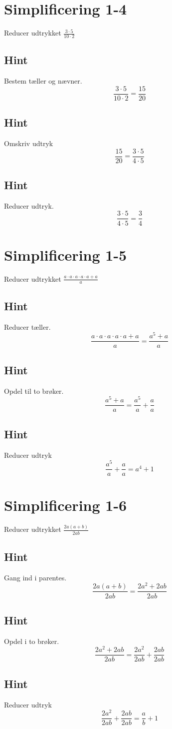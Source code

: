 \documentclass{article}
\newenvironment{exercise}[1]{\newpage\section{#1}}{}
\newcommand{\answerbox}[1]{\fbox{$#1$}}
\newcommand{\hint}{\subsection*{Hint}}
\begin{document}
\newpage

\begin{exercise}{Simplificering 1-4}
	
	Reducer udtrykket $\frac{3 \cdot 5}{10 \cdot 2}$
	
	\answerbox{\frac{3}{4}}
	
	\hint
	
	Bestem tæller og nævner.
	\[
	\frac{3 \cdot 5}{10 \cdot 2} = \frac{15}{20}
	\]
	
	\hint
	
	Omskriv udtryk
	\[
	 \frac{15}{20} = \frac{3 \cdot 5}{4 \cdot 5}
	\]
	
	\hint 
	
	Reducer udtryk.
	\[
	\frac{3 \cdot 5}{4 \cdot 5} = \frac{3}{4}
	\]
	
\end{exercise}

\newpage

\begin{exercise}{Simplificering 1-5}
	
	Reducer udtrykket $\frac{a \cdot a \cdot a \cdot a \cdot a + a}{a}$
	
	\answerbox{a^4 + 1}
	
	\hint
	
	Reducer tæller.
	\[
	\frac{a \cdot a \cdot a \cdot a \cdot a + a}{a}  = \frac{a^5+a}{a}
	\]
	
	\hint 
	
	Opdel  til to brøker.
	\[
	\frac{a^5+a}{a} = \frac{a^5}{a} + \frac{a}{a}
	\]
	
	\hint
	
	Reducer udtryk 
	\[
	 \frac{a^5}{a} + \frac{a}{a} = a^4 + 1
	\]
		
\end{exercise}

\newpage

\begin{exercise}{Simplificering 1-6}
	
	Reducer udtrykket $\frac{2a(a+b)}{2ab}$
	
	\answerbox{\frac{a}{b} + 1}
	
	\hint
	
	Gang ind i parentes.
	\[
	\frac{2a(a+b)}{2ab} = \frac{2a^2 + 2ab}{2ab}
	\]
	
	\hint
	
	Opdel i to brøker.
	\[
	 \frac{2a^2 + 2ab}{2ab} = \frac{2a^2}{2ab} + \frac{2ab}{2ab}
	\]
	
	
	\hint
	
	Reducer udtryk 
	\[
	\frac{2a^2}{2ab} + \frac{2ab}{2ab} = \frac{a}{b} + 1
	\]
	
\end{exercise}
\end{document}
